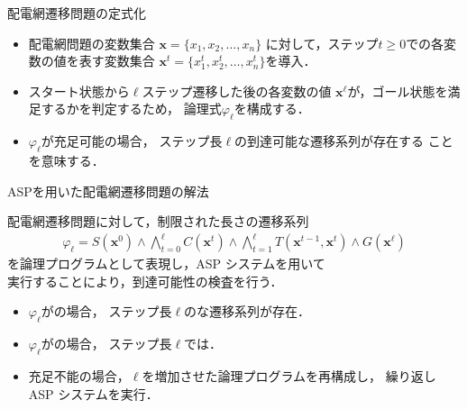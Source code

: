 \documentclass[dvipdfmx,11pt]{beamer}
\begin{document}
\begin{frame}[noframenumbering]{配電網遷移問題の定式化}
  \begin{itemize}
  \item 配電網問題の変数集合
    $\boldsymbol{x} = \{x_1,x_2,\ldots,x_n\}$
    に対して，ステップ$t\geq 0$での各変数の値を表す変数集合
    $\boldsymbol{x}^{t} = \{x_1^t,x_2^t,\ldots,x_n^t\}$を導入．
  \item スタート状態から$\ell$ステップ遷移した後の各変数の値
    $\boldsymbol{x}^{\ell}$が，ゴール状態を満足するかを判定するため，
    論理式$\varphi_{\ell}$を構成する．
  \end{itemize}
  \begin{itemize}
  \item {$\varphi_{\ell}$}が充足可能の場合，
    ステップ長$\ell$の到達可能な遷移系列が存在する
    ことを意味する．
  \end{itemize}
\end{frame}
\begin{frame}{ASPを用いた配電網遷移問題の解法} 
  \begin{alertblock}{}\centering
    配電網遷移問題に対して，制限された長さの遷移系列
    \begin{align*}
    \varphi_{\ell} = S(\boldsymbol{x}^0)  
    \land \bigwedge_{t=0}^{\ell} C(\boldsymbol{x}^t) 
    \land \bigwedge_{t=1}^{\ell} T(\boldsymbol{x}^{t-1},\boldsymbol{x}^{t}) 
    \land G(\boldsymbol{x}^\ell)  
        \end{align*}
    を論理プログラムとして表現し，ASP システムを用いて\\
   実行することにより，到達可能性の検査を行う．
  \end{alertblock}\vfill
  \begin{itemize}
   \item $\varphi_{\ell}$がの場合，
         ステップ長$\ell$のな遷移系列が存在．
   \item $\varphi_{\ell}$がの場合，
         ステップ長$\ell$では．
   \item 充足不能の場合，$\ell$を増加させた論理プログラムを再構成し，
         繰り返し ASP システムを実行．
  \end{itemize}
\end{frame}
\end{document}
